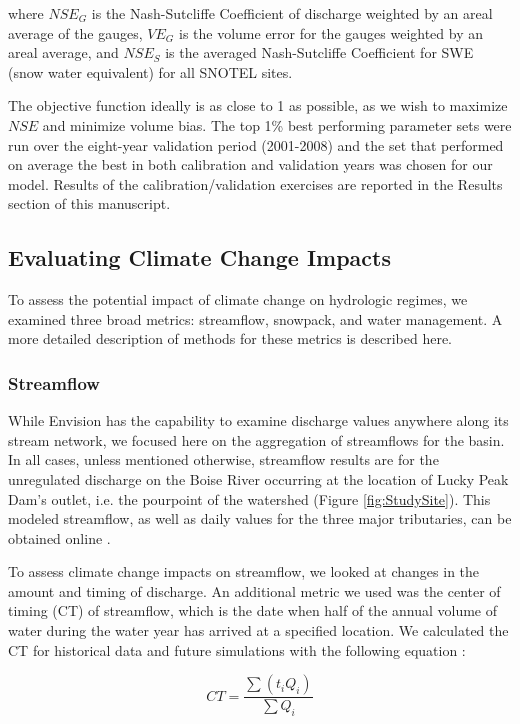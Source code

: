 \documentclass[11pt,letterpaper]{article}
\begin{document}
where $NSE_G$ is the Nash-Sutcliffe Coefficient of discharge weighted by an areal average of the gauges, $VE_G$  is the volume error for the gauges weighted by an areal average, and $NSE_S$ is the averaged Nash-Sutcliffe Coefficient for SWE (snow water equivalent) for all SNOTEL sites. 

The objective function ideally is as close to 1 as possible, as we wish to maximize $NSE$ and minimize volume bias. The top 1\% best performing parameter sets were run over the eight-year validation period (2001-2008) and the set that performed on average the best in both calibration and validation years was chosen for our model. Results of the calibration/validation exercises are reported in the Results section of this manuscript.

\subsection{Evaluating Climate Change Impacts}

To assess the potential impact of climate change on hydrologic regimes, we examined three broad metrics: streamflow, snowpack, and water management. A more detailed description of methods for these metrics is described here.

\subsubsection{Streamflow}
While Envision has the capability to examine discharge values anywhere along its stream network, we focused here on the aggregation of streamflows for the basin. In all cases, unless mentioned otherwise, streamflow results are for the unregulated discharge on the Boise River occurring at the location of Lucky Peak Dam's outlet, i.e. the pourpoint of the watershed (Figure \ref{fig:StudySite}). This modeled streamflow, as well as daily values for the three major tributaries, can be obtained online \citep{Steimke:2017hb}. 

To assess climate change impacts on streamflow, we looked at changes in the amount and timing of discharge. An additional metric we used was the center of timing (CT) of streamflow, which is the date when half of the annual volume of water during the water year has arrived at a specified location. We calculated the CT for historical data and future simulations with the following equation \citep{Stewart:2005ed}: 

\begin{equation}
CT = \frac{\sum \left(t_iQ_i\right)}{\sum Q_i}
\end{equation}
\end{document}
